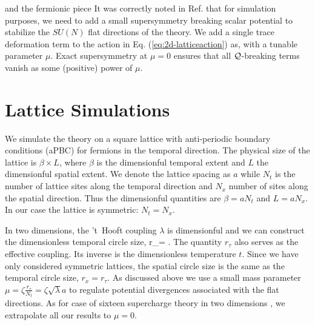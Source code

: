 
and the fermionic piece
It was correctly noted in Ref. \cite{Kanamori:2008bk} that for simulation purposes, we need to add a small supersymmetry breaking scalar potential to stabilize the $SU(N)$ flat directions of the theory. We add a single trace deformation term to the action in Eq. (\ref{eq:2d-latticeaction}) as, 
with a tunable parameter $\mu$. Exact supersymmetry at $\mu = 0$ ensures that all $\mathcal Q$-breaking terms vanish as some (positive) power of $\mu$.

\section{Lattice Simulations}
\label{sec:computation}

We simulate the theory on a square lattice with anti-periodic boundary conditions (aPBC) for fermions in the temporal direction. The physical size of the lattice is $\beta \times L$, where $\beta$ is the dimensionful temporal extent and $L$ the dimensionful spatial extent. We denote the lattice spacing as $a$ while $N_t$ is the number of lattice sites along the temporal direction and $N_x$ number of sites along the spatial direction. Thus the dimensionful quantities are $\beta = a N_t$ and $L = a N_x$. In our case the lattice is symmetric: $N_t = N_x$. 

In two dimensions, the 't~Hooft coupling $\lambda$ is dimensionful and we can construct the dimensionless temporal circle size, 
\beq
r_\tau = \sqrt{\lambda} \beta.
\eeq
The quantity $r_\tau$ also serves as the effective coupling. Its inverse is the dimensionless temperature $t$. Since we have only considered symmetric lattices, the spatial circle size is the same as the temporal circle size, $r_x = r_\tau$. As discussed above we use a small mass parameter $\mu = \zeta \frac{r_\tau}{N_t} = \zeta \sqrt{\lambda} a$ to regulate potential divergences associated with the flat directions. As for case of sixteen supercharge theory in two dimensions \cite{Catterall:2017lub, Jha:2017zad}, we extrapolate all our results to $\mu = 0$.


